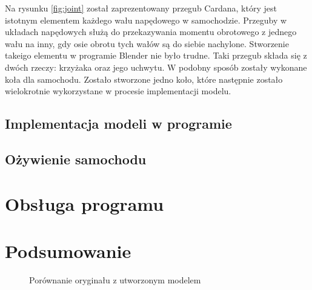 \documentclass[a4paper,12pt]{article}
\numberwithin{equation}{section}
\begin{document}
 Na rysunku \ref{fig:joint} został zaprezentowany przegub Cardana, który jest istotnym elementem każdego wału napędowego w samochodzie. Przeguby w układach napędowych służą do przekazywania momentu obrotowego z jednego wału na inny, gdy osie obrotu tych wałów są do siebie nachylone. Stworzenie takeigo elementu w programie Blender nie było trudne. Taki przegub składa się z dwóch rzeczy: krzyżaka oraz jego uchwytu.
 \newline
 \indent W podobny sposób zostały wykonane koła dla samochodu. Zostało stworzone jedno koło, które następnie zostało wielokrotnie wykorzystane w procesie implementacji modelu. 


\subsection{Implementacja modeli w programie}
\subsection{Ożywienie samochodu}
\section{Obsługa programu}
\section{Podsumowanie}
\begin{figure}[h!]
    \centering
    \caption{Porównanie oryginału z utworzonym modelem}
    \label{fig:furgon}
\end{figure}
\end{document}
